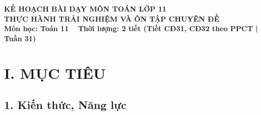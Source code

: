 \documentclass[12pt, a4paper]{article}
\begin{document}
\begin{center}
    {\fontsize{14pt}{17pt}\selectfont \textbf{KẾ HOẠCH BÀI DẠY MÔN TOÁN LỚP 11}}\\[6pt]
    {\fontsize{16pt}{19pt}\selectfont \textbf{THỰC HÀNH TRẢI NGHIỆM VÀ ÔN TẬP CHUYÊN ĐỀ}}\\[4pt]
    {\fontsize{12pt}{15pt}\selectfont \textbf{Môn học: Toán 11} \ \textbar \ \textbf{Thời lượng: 2 tiết (Tiết CĐ31, CĐ32 theo PPCT | Tuần 31)}}
\end{center}

\vspace{5pt}

\section*{I. MỤC TIÊU}

\subsection*{1. Kiến thức, Năng lực}
\end{document}
